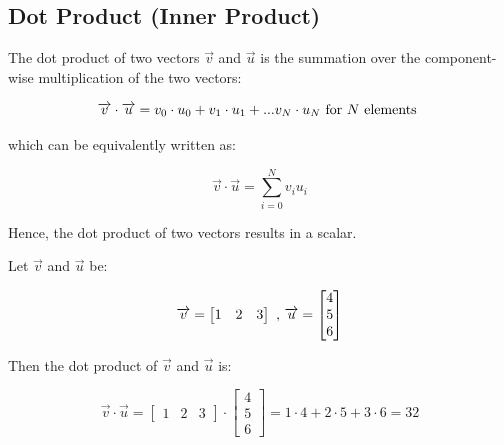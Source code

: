 \documentclass[12pt,letterpaper]{article}
\begin{document}
\subsection{Dot Product (Inner Product)}

The dot product of two vectors $\overrightarrow{v}$ and $ \overrightarrow{u}$ is the summation over the component-wise multiplication of the two vectors:

\begin{equation}
    \overrightarrow{v} \cdot \overrightarrow{u} = \\
    v_{0} \cdot u_{0} + \\
    v_{1} \cdot u_{1} + \\
    ... 
    v_{N} \cdot u_{N} \\
    \text{ for } N \text{ elements }
\end{equation}

which can be equivalently written as:

\begin{equation}
    \overrightarrow{v} \cdot \overrightarrow{u} = \sum^{N}_{i=0} v_{i}u_{i}
\end{equation}

Hence, the dot product of two vectors results in a scalar. 

Let $\overrightarrow{v}$ and $\overrightarrow{u}$ be:

\begin{equation}
    \overrightarrow{v} = \begin{bmatrix} 1 & 2 & 3 \end{bmatrix} \\
    \text{ , } \\
    \overrightarrow{u} = \begin{bmatrix} 4 \\ 5 \\ 6 \end{bmatrix}
\end{equation}

Then the dot product of $\overrightarrow{v}$ and $\overrightarrow{u}$ is:

\begin{equation}
\overrightarrow{v} \cdot \overrightarrow{u} = \begin{bmatrix} 1 & 2 & 3 \end{bmatrix} \cdot \begin{bmatrix} 4 \\ 5 \\ 6 \end{bmatrix} = 1 \cdot 4 + 2 \cdot 5 + 3 \cdot 6 = 32
\end{equation}
\end{document}
